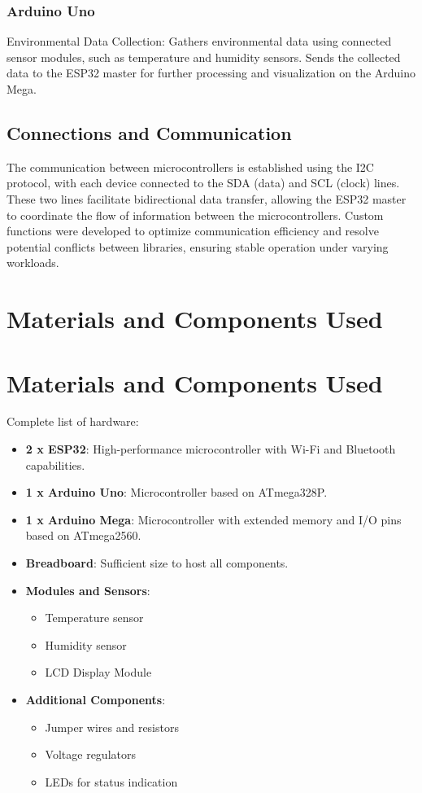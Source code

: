 \documentclass[a4paper,12pt]{report}
\begin{document}
\subsection{Arduino Uno}
Environmental Data Collection:
Gathers environmental data using connected sensor modules, such as temperature and humidity sensors.
Sends the collected data to the ESP32 master for further processing and visualization on the Arduino Mega.

\section{Connections and Communication}
The communication between microcontrollers is established using the I2C protocol, with each device connected to the SDA (data) and SCL (clock) lines. These two lines facilitate bidirectional data transfer, allowing the ESP32 master to coordinate the flow of information between the microcontrollers. Custom functions were developed to optimize communication efficiency and resolve potential conflicts between libraries, ensuring stable operation under varying workloads.
\newpage

\chapter{Materials and Components Used}

    
    \chapter{Materials and Components Used}
    Complete list of hardware:
    
    \begin{itemize}
        \item \textbf{2 x ESP32}: High-performance microcontroller with Wi-Fi and Bluetooth capabilities.
        \item \textbf{1 x Arduino Uno}: Microcontroller based on ATmega328P.
        \item \textbf{1 x Arduino Mega}: Microcontroller with extended memory and I/O pins based on ATmega2560.
        \item \textbf{Breadboard}: Sufficient size to host all components.
        \item \textbf{Modules and Sensors}:
        \begin{itemize}
            \item Temperature sensor
            \item Humidity sensor
            \item LCD Display Module
        \end{itemize}
        \item \textbf{Additional Components}:
        \begin{itemize}
            \item Jumper wires and resistors
            \item Voltage regulators
            \item LEDs for status indication
        \end{itemize}
    \end{itemize}
    
\end{document}
